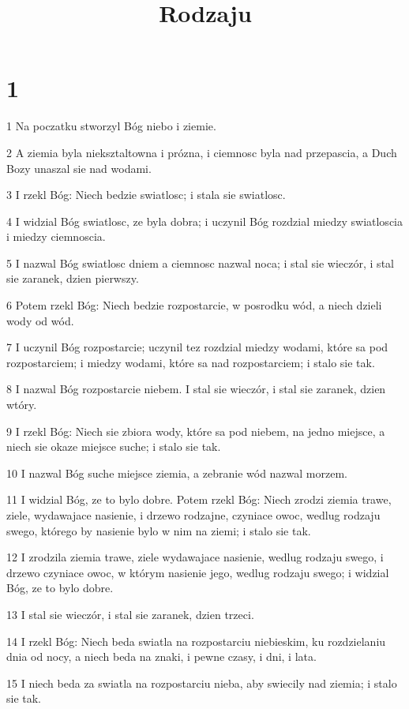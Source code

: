 

\title{Rodzaju}


\chapter{1}

\par 1 Na poczatku stworzyl Bóg niebo i ziemie.
\par 2 A ziemia byla nieksztaltowna i prózna, i ciemnosc byla nad przepascia, a Duch Bozy unaszal sie nad wodami.
\par 3 I rzekl Bóg: Niech bedzie swiatlosc; i stala sie swiatlosc.
\par 4 I widzial Bóg swiatlosc, ze byla dobra; i uczynil Bóg rozdzial miedzy swiatloscia i miedzy ciemnoscia.
\par 5 I nazwal Bóg swiatlosc dniem a ciemnosc nazwal noca; i stal sie wieczór, i stal sie zaranek, dzien pierwszy.
\par 6 Potem rzekl Bóg: Niech bedzie rozpostarcie, w posrodku wód, a niech dzieli wody od wód.
\par 7 I uczynil Bóg rozpostarcie; uczynil tez rozdzial miedzy wodami, które sa pod rozpostarciem; i miedzy wodami, które sa nad rozpostarciem; i stalo sie tak.
\par 8 I nazwal Bóg rozpostarcie niebem. I stal sie wieczór, i stal sie zaranek, dzien wtóry.
\par 9 I rzekl Bóg: Niech sie zbiora wody, które sa pod niebem, na jedno miejsce, a niech sie okaze miejsce suche; i stalo sie tak.
\par 10 I nazwal Bóg suche miejsce ziemia, a zebranie wód nazwal morzem.
\par 11 I widzial Bóg, ze to bylo dobre. Potem rzekl Bóg: Niech zrodzi ziemia trawe, ziele, wydawajace nasienie, i drzewo rodzajne, czyniace owoc, wedlug rodzaju swego, którego by nasienie bylo w nim na ziemi; i stalo sie tak.
\par 12 I zrodzila ziemia trawe, ziele wydawajace nasienie, wedlug rodzaju swego, i drzewo czyniace owoc, w którym nasienie jego, wedlug rodzaju swego; i widzial Bóg, ze to bylo dobre.
\par 13 I stal sie wieczór, i stal sie zaranek, dzien trzeci.
\par 14 I rzekl Bóg: Niech beda swiatla na rozpostarciu niebieskim, ku rozdzielaniu dnia od nocy, a niech beda na znaki, i pewne czasy, i dni, i lata.
\par 15 I niech beda za swiatla na rozpostarciu nieba, aby swiecily nad ziemia; i stalo sie tak.
